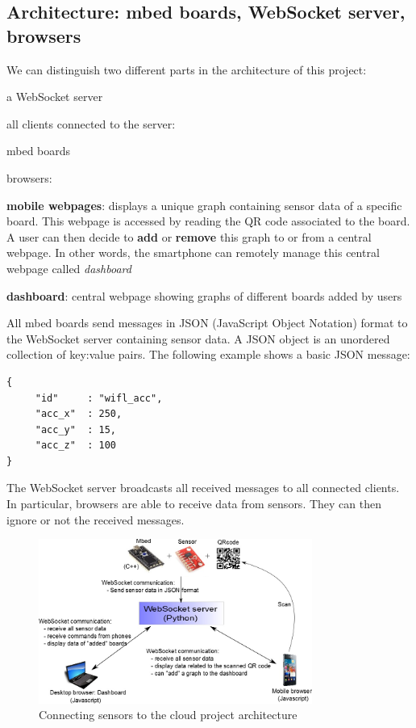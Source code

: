 \documentclass[pdftex,10pt,a4paper]{report}
\newenvironment{packed_item}{
\begin{itemize}
  \setlength{\itemsep}{1pt}
  \setlength{\parskip}{0pt}
  \setlength{\parsep}{0pt}
}{\end{itemize}}
\begin{document}
\newpage

\subsection{Architecture: mbed boards, WebSocket server, browsers}
We can distinguish two different parts in the architecture of this project:
\begin{packed_item}
	\item a WebSocket server
	\item all clients connected to the server:
	\begin{packed_item}
		\item mbed boards
		\item browsers:
		\begin{packed_item}
			\item \textbf{mobile webpages}: displays a unique graph containing sensor data of a specific board. This webpage is accessed by reading the QR code associated to the board. A user can then decide to \textbf{add} or \textbf{remove} this graph to or from a central webpage. In other words, the smartphone can remotely manage this central webpage called \textit{dashboard}
			\item \textbf{dashboard}: central webpage showing graphs of different boards added by users
		\end{packed_item}
	\end{packed_item}
\end{packed_item}

All mbed boards send messages in JSON (JavaScript Object Notation) format to the WebSocket server containing sensor data. A JSON object is an unordered collection of key:value pairs. The following example shows a basic JSON message:
\begin{lstlisting}[label=JSON message example,caption=JSON message example]
{
     "id"     : "wifl_acc",
     "acc_x"  : 250,
     "acc_y"  : 15,
     "acc_z"  : 100
}
\end{lstlisting}

The WebSocket server broadcasts all received messages to all connected clients. In particular, browsers are able to receive data from sensors. They can then ignore or not the received messages.

\begin{figure}[h!]
		\centering
		\includegraphics[width=0.8\textwidth]{./ws_arch.jpg}
		\caption{Connecting sensors to the cloud project architecture}
		\label{Connecting sensors to the cloud project architecture}
\end{figure}
\end{document}
